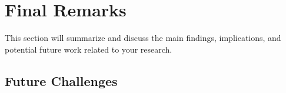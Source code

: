 \documentclass[../thesis.tex]{subfiles}
\begin{document}
	\newpage
	
	\section{Final Remarks}\label{sec:final-remarks}

	This section will summarize and discuss the main findings, implications, and potential future work related to your research.	

	\subsection{Future Challenges}
\end{document}
